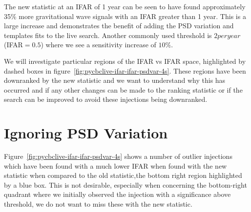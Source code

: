 The new statistic at an IFAR of 1 year can be seen to have found approximately 35\% more gravitational wave signals with an IFAR greater than 1 year. This is a large increase and demonstrates the benefit of adding the PSD variation and templates fits to the live search. Another commonly used threshold is $2 per year$ (IFAR$ = 0.5$) where we see a sensitivity increase of $10\%$.

We will investigate particular regions of the IFAR vs IFAR space, highlighted by dashed boxes in figure~\ref{fig:pycbclive-ifar-ifar-psdvar-4s}. These regions have been downranked by the new statistic and we want to understand why this has occurred and if any other changes can be made to the ranking statistic or if the search can be improved to avoid these injections being downranked.

\section{\label{pycbclive-ignoring-psdvar}Ignoring PSD Variation}

Figure~\ref{fig:pycbclive-ifar-ifar-psdvar-4s} shows a number of outlier injections which have been found with a much lower IFAR when found with the new statistic when compared to the old statistic,the bottom right region highlighted by a blue box. This is not desirable, especially when concerning the bottom-right quadrant where we initially observed the injection with a significance above threshold, we do not want to miss these with the new statistic.

